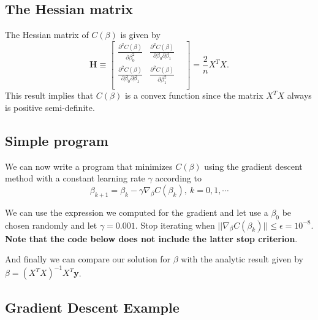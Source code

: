 \documentclass[%
oneside,                 %
final,                   %
10pt]{article}
\begin{document}
\subsection*{The Hessian matrix}
The Hessian matrix of $C(\beta)$ is given by 
\[
\bm{H} \equiv \begin{bmatrix}
\frac{\partial^2 C(\beta)}{\partial \beta_0^2} & \frac{\partial^2 C(\beta)}{\partial \beta_0 \partial \beta_1}  \\
\frac{\partial^2 C(\beta)}{\partial \beta_0 \partial \beta_1} & \frac{\partial^2 C(\beta)}{\partial \beta_1^2} &  \\
\end{bmatrix} = \frac{2}{n}X^T X.
\]
This result implies that $C(\beta)$ is a convex function since the matrix $X^T X$ always is positive semi-definite.




\subsection*{Simple program}

We can now write a program that minimizes $C(\beta)$ using the gradient descent method with a constant learning rate $\gamma$ according to 
\[
\beta_{k+1} = \beta_k - \gamma \nabla_\beta C(\beta_k), \ k=0,1,\cdots 
\]

We can use the expression we computed for the gradient and let use a
$\beta_0$ be chosen randomly and let $\gamma = 0.001$. Stop iterating
when $||\nabla_\beta C(\beta_k) || \leq \epsilon = 10^{-8}$. \textbf{Note that the code below does not include the latter stop criterion}.

And finally we can compare our solution for $\beta$ with the analytic result given by 
$\beta= (X^TX)^{-1} X^T \mathbf{y}$.

\subsection*{Gradient Descent Example}
\end{document}
